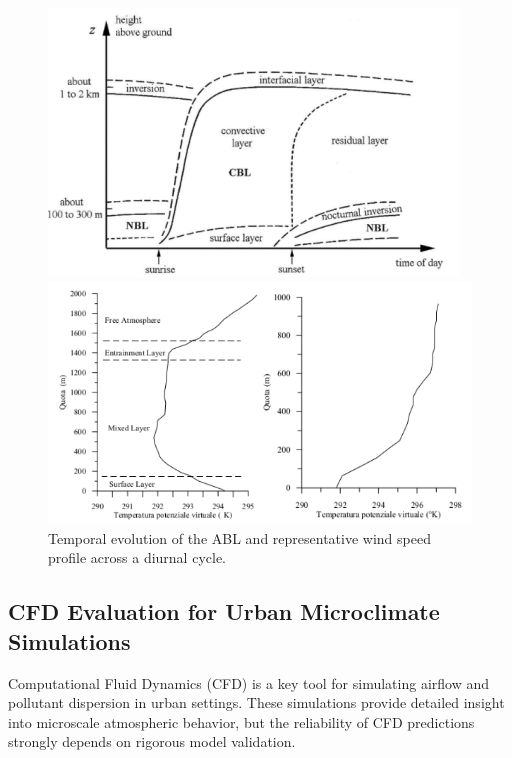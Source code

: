 \begin{figure}[h!]
    \centering
    \begin{minipage}{0.47\textwidth}
        \centering
        \includegraphics[width=\textwidth]{imgs/abl_cycle.png}
    \end{minipage}
    \hfill
    \begin{minipage}{0.47\textwidth}
        \centering
        \includegraphics[width=\textwidth]{imgs/wind_speed_cycle.png}
    \end{minipage}
    \caption{Temporal evolution of the ABL and representative wind speed profile across a diurnal cycle.}
\end{figure}

\subsection{CFD Evaluation for Urban Microclimate Simulations}
Computational Fluid Dynamics (CFD) is a key tool for simulating airflow and pollutant dispersion in urban settings. These simulations provide detailed insight into microscale atmospheric behavior, but the reliability of CFD predictions strongly depends on rigorous model validation.

